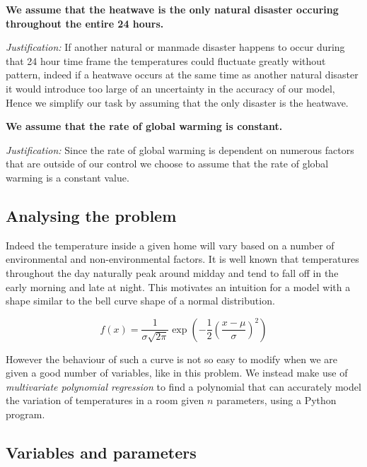 \documentclass[11pt]{article}
\begin{document}
\noindent
\textbf{\sffamily We assume that the heatwave is the only natural disaster occuring throughout the entire 24 hours.}

\textit{Justification:} If another natural or manmade disaster happens to occur during that 24 hour time frame the temperatures
could fluctuate greatly without pattern, indeed if a heatwave occurs at the same time as another natural disaster it
would introduce too large of an uncertainty in the accuracy of our model, Hence we simplify our task by assuming
that the only disaster is the heatwave.

\noindent
\textbf{\sffamily We assume that the rate of global warming is constant.}

\textit{Justification:} Since the rate of global warming is dependent on numerous factors that are outside of our control we
choose to assume that the rate of global warming is a constant value.

\subsection{Analysing the problem}

Indeed the temperature inside a given home will vary based on a number of environmental and non-environmental
factors. It is well known that temperatures throughout the day naturally peak around midday and tend to fall off in
the early morning and late at night. This motivates an intuition for a model with a shape similar to the bell curve
shape of a normal distribution.

\[
f(x) = \frac{1}{\sigma \sqrt{2\pi}} \exp \left( -\frac{1}{2} \left( \frac{x-\mu}{\sigma} \right)^2 \right)
\]

\noindent
However the behaviour of such a curve is not so easy to modify when we are given a good number of variables, like in
this problem. We instead make use of \textit{multivariate polynomial regression} to find a polynomial that can
accurately model the variation of temperatures in a room given $n$ parameters, using a Python program.

\subsection{Variables and parameters}
\end{document}
